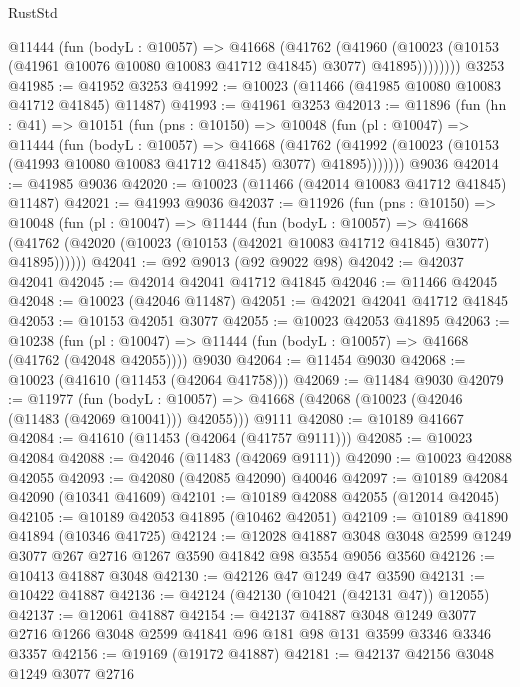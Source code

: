 \begin{lexlean}{RustStd}
\begin{coremodule}
          @11444
            (fun (bodyL : @10057) =>
            @41668
              (@41762
                (@41960
                  (@10023 (@10153 (@41961 @10076 @10080 @10083 @41712 @41845) @3077) @41895))))))))
    @3253
@41985 := @41952 @3253
@41992 := @10023 (@11466 (@41985 @10080 @10083 @41712 @41845) @11487)
@41993 := @41961 @3253
@42013 := @11896
    (fun (hn : @41) =>
    @10151
      (fun (pns : @10150) =>
      @10048
        (fun (pl : @10047) =>
        @11444
          (fun (bodyL : @10057) =>
          @41668
            (@41762
              (@41992 (@10023 (@10153 (@41993 @10080 @10083 @41712 @41845) @3077) @41895)))))))
    @9036
@42014 := @41985 @9036
@42020 := @10023 (@11466 (@42014 @10083 @41712 @41845) @11487)
@42021 := @41993 @9036
@42037 := @11926
    (fun (pns : @10150) =>
    @10048
      (fun (pl : @10047) =>
      @11444
        (fun (bodyL : @10057) =>
        @41668 (@41762 (@42020 (@10023 (@10153 (@42021 @10083 @41712 @41845) @3077) @41895))))))
@42041 := @92 @9013 (@92 @9022 @98)
@42042 := @42037 @42041
@42045 := @42014 @42041 @41712 @41845
@42046 := @11466 @42045
@42048 := @10023 (@42046 @11487)
@42051 := @42021 @42041 @41712 @41845
@42053 := @10153 @42051 @3077
@42055 := @10023 @42053 @41895
@42063 := @10238
    (fun (pl : @10047) => @11444 (fun (bodyL : @10057) => @41668 (@41762 (@42048 @42055))))
    @9030
@42064 := @11454 @9030
@42068 := @10023 (@41610 (@11453 (@42064 @41758)))
@42069 := @11484 @9030
@42079 := @11977
    (fun (bodyL : @10057) => @41668 (@42068 (@10023 (@42046 (@11483 (@42069 @10041))) @42055)))
    @9111
@42080 := @10189 @41667
@42084 := @41610 (@11453 (@42064 (@41757 @9111)))
@42085 := @10023 @42084
@42088 := @42046 (@11483 (@42069 @9111))
@42090 := @10023 @42088 @42055
@42093 := @42080 (@42085 @42090) @40046
@42097 := @10189 @42084 @42090 (@10341 @41609)
@42101 := @10189 @42088 @42055 (@12014 @42045)
@42105 := @10189 @42053 @41895 (@10462 @42051)
@42109 := @10189 @41890 @41894 (@10346 @41725)
@42124 := @12028
    @41887
    @3048
    @3048
    @2599
    @1249
    @3077
    @267
    @2716
    @1267
    @3590
    @41842
    @98
    @3554
    @9056
    @3560
@42126 := @10413 @41887 @3048
@42130 := @42126 @47 @1249 @47 @3590
@42131 := @10422 @41887
@42136 := @42124 (@42130 (@10421 (@42131 @47)) @12055)
@42137 := @12061 @41887
@42154 := @42137
    @41887
    @3048
    @1249
    @3077
    @2716
    @1266
    @3048
    @2599
    @41841
    @96
    @181
    @98
    @131
    @3599
    @3346
    @3346
    @3357
@42156 := @19169 (@19172 @41887)
@42181 := @42137
    @42156
    @3048
    @1249
    @3077
    @2716

\end{coremodule}
\end{lexlean}

